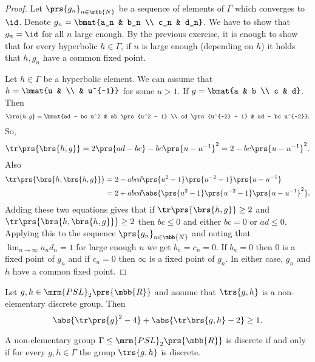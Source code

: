 \documentclass[10pt, twoside]{book}
\begin{document}
\begin{proof}
Let $\prs{g_n}_{n \in \mbb{N}}$ be a sequence of elements of $\Gamma$ which converges to $\id$. Denote $g_n = \bmat{a_n & b_n \\ c_n & d_n}$. We have to show that $g_n = \id$ for all $n$ large enough.
By the previous exercise, it is enough to show that for every hyperbolic $h \in \Gamma$, if $n$ is large enough (depending on $h$) it holds that $h, g_n$ have a common fixed point.

Let $h \in \Gamma$ be a hyperbolic element. We can assume that $h = \bmat{u & \\ & u^{-1}}$ for some $u > 1$. If $g = \bmat{a & b \\ c & d}$. Then
\[\brs{h,g} = \bmat{ad - bc u^2 & ab \prs{u^2 - 1} \\ cd \prs{u^{-2} - 1} & ad - bc u^{-2}} \text{.}\]
So,
\[\tr\prs{\brs{h,g}} = 2 \prs{ad - bc} - bc\prs{u - u^{-1}}^2 = 2 - bc \prs{u-u^{-1}}^2 \text{.}\]
Also
\begin{align*}
\tr\prs{\brs{h, \brs{h,g}}} &= 2 - abcd \prs{u^2 - 1}\prs{u^{-2} - 1}\prs{u - u^{-1}}
\\&=
2 + abcd \abs{\prs{u^2 - 1}\prs{u^{-2} - 1}\prs{u - u^{-1}}^2} \text{.}
\end{align*}
Adding these two equations gives that if $\tr\prs{\brs{h,g}} \geq 2$ and $\tr\prs{\brs{h,\brs{h,g}}} \geq 2$ then $bc \leq 0$ and either $bc = 0$ or $ad \leq 0$.
Applying this to the sequence $\prs{g_n}_{n \in \mbb{N}}$ and noting that $\lim_{n \to \infty} a_n d_n = 1$ for large enough $n$ we get $b_n = c_n = 0$. If $b_n = 0$ then $0$ is a fixed point of $g_n$ and if $c_n = 0$ then $\infty$ is a fixed point of $g_n$. In either case, $g_n$ and $h$ have a common fixed point.
\end{proof}


\begin{theorem}\label{theorem:Jorgensen_inequality}
Let $g,h \in \mrm{PSL}_2\prs{\mbb{R}}$ and assume that $\trs{g,h}$ is a non-elementary discrete group.
Then
\[\abs{\tr\prs{g}^2 - 4} + \abs{\tr\brs{g,h} - 2} \geq 1 \text{.}\]
\end{theorem}

\begin{theorem}
A non-elementary group $\Gamma \leq \mrm{PSL}_2\prs{\mbb{R}}$ is discrete if and only if for every $g,h \in \Gamma$ the group $\trs{g,h}$ is discrete.
\end{theorem}
\end{document}

